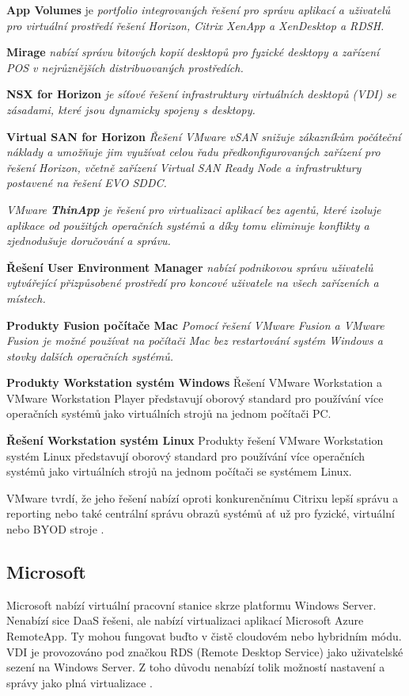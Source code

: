 \textbf{App Volumes} je \textit{portfolio integrovaných řešení pro správu aplikací a uživatelů pro virtuální prostředí řešení Horizon, Citrix XenApp a XenDesktop a RDSH.}

\textbf{Mirage} \textit{nabízí správu bitových kopií desktopů pro fyzické desktopy a zařízení POS v nejrůznějších distribuovaných prostředích.}

\textbf{NSX for Horizon} \textit{je síťové řešení infrastruktury virtuálních desktopů (VDI) se zásadami, které jsou dynamicky spojeny s desktopy.}

\textbf{Virtual SAN for Horizon} \textit{Řešení VMware vSAN snižuje zákazníkům počáteční náklady a umožňuje jim využívat celou řadu předkonfigurovaných zařízení pro řešení Horizon, včetně zařízení Virtual SAN Ready Node a infrastruktury postavené na řešení EVO SDDC.}

\textit{VMware \textbf{ThinApp} je řešení pro virtualizaci aplikací bez agentů, které izoluje aplikace od použitých operačních systémů a díky tomu eliminuje konflikty a zjednodušuje doručování a správu.}

\textbf{Řešení User Environment Manager} \textit{nabízí podnikovou správu uživatelů vytvářející přizpůsobené prostředí pro koncové uživatele na všech zařízeních a místech.}

\textbf{Produkty Fusion počítače Mac} \textit{Pomocí řešení VMware Fusion a VMware Fusion je možné používat na počítači Mac bez restartování systém Windows a stovky dalších operačních systémů.}

\textbf{Produkty Workstation systém Windows} Řešení VMware Workstation a VMware Workstation Player představují oborový standard pro používání více operačních systémů jako virtuálních strojů na jednom počítači PC.

\textbf{Řešení Workstation systém Linux} Produkty řešení VMware Workstation systém Linux představují oborový standard pro používání více operačních systémů jako virtuálních strojů na jednom počítači se systémem Linux.

VMware tvrdí, že jeho řešení nabízí oproti konkurenčnímu Citrixu lepší správu a reporting nebo také centrální správu obrazů systémů ať už pro fyzické, virtuální nebo BYOD stroje \cite{VMBetter}. %


\subsection{Microsoft}
Microsoft nabízí virtuální pracovní stanice skrze platformu Windows Server. Nenabízí sice DaaS řešeni, ale nabízí virtualizaci aplikací Microsoft Azure RemoteApp. Ty mohou fungovat buďto v čistě cloudovém nebo hybridním módu. VDI je provozováno pod značkou RDS (Remote Desktop Service) jako uživatelské sezení na Windows Server. Z toho důvodu nenabízí tolik možností nastavení a správy jako plná virtualizace \cite{VMwareMicrosoft}. %

